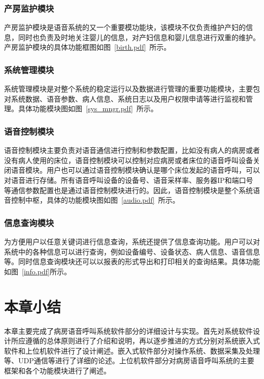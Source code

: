 \subsubsection{产房监护模块}
产房监护模块是语音系统的又一个重要模功能块，该模块不仅负责维护产妇的信息，同时也负责及时地关注婴儿的信息，对产妇信息和婴儿信息进行双重的维护。产房监护模块的具体功能框图如图~\ref{birth.pdf}~所示。

\subsubsection{系统管理模块}
系统管理模块是对整个系统的稳定运行以及数据进行管理的重要功能模块，主要包对系统数据、语音参数、病人信息、系统日志以及用户权限申请等进行监视和管理。具体功能模块图如图~\ref{sys_mngr.pdf}~所示。
	
\subsubsection{语音控制模块}
语音控制模块主要负责对语音通信进行控制和参数配置，比如没有病人的病房或者没有病人使用的床位，语音控制模块可以控制对应病房或者床位的语音呼叫设备关闭语音模块。用户也可以通过语音控制模块确认是哪个床位发起的语音呼叫，可以对语音进行存储。所有语音呼叫设备的设备号、语音采样率、服务器IP和端口号等通信参数配置也是通过语音控制模块进行的。因此，语音控制模块是整个系统语音控制中枢，具体的功能模块图如图~\ref{audio.pdf}~所示。

\subsubsection{信息查询模块}
为方便用户以任意关键词进行信息查询，系统还提供了信息查询功能。用户可以对系统中的各种信息可以进行查询，例如设备编号、设备状态、病人信息、语音信息等。同时信息查询模块还可以以报表的形式导出和打印相关的查询结果。具体功能如图~\ref{info.pdf}所示。

\section{本章小结}
本章主要完成了病房语音呼叫系统软件部分的详细设计与实现。首先对系统软件设计所应遵循的总体原则进行了介绍和说明，再以逐步推进的方式分别对系统嵌入式软件和上位机软件进行了设计阐述。嵌入式软件部分对操作系统、数据采集及处理等、UDP通信等进行了详细的论述。上位机软件部分对病房语音呼叫系统的主要框架和各个功能模块进行了阐述。
